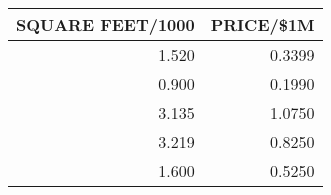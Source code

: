 \begin{tabular}{rr}
\toprule
 SQUARE FEET/1000 &  PRICE/\$1M \\
\midrule
            1.520 &     0.3399 \\
            0.900 &     0.1990 \\
            3.135 &     1.0750 \\
            3.219 &     0.8250 \\
            1.600 &     0.5250 \\
\bottomrule
\end{tabular}
